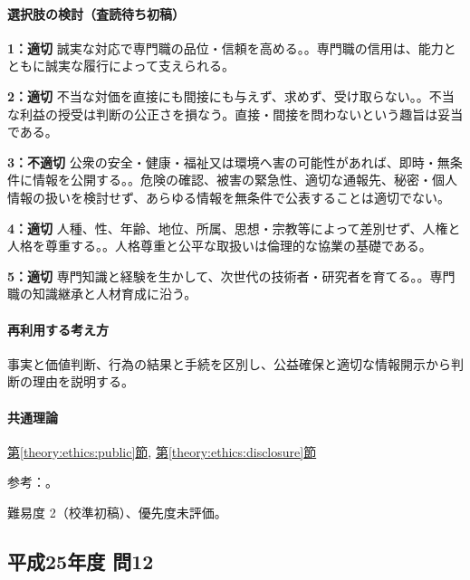 \paragraph{選択肢の検討（査読待ち初稿）}\mbox{}\par

\noindent\textbf{1：適切} 誠実な対応で専門職の品位・信頼を高める。。専門職の信用は、能力とともに誠実な履行によって支えられる。\par

\noindent\textbf{2：適切} 不当な対価を直接にも間接にも与えず、求めず、受け取らない。。不当な利益の授受は判断の公正さを損なう。直接・間接を問わないという趣旨は妥当である。\par

\noindent\textbf{3：不適切} 公衆の安全・健康・福祉又は環境へ害の可能性があれば、即時・無条件に情報を公開する。。危険の確認、被害の緊急性、適切な通報先、秘密・個人情報の扱いを検討せず、あらゆる情報を無条件で公表することは適切でない。\par

\noindent\textbf{4：適切} 人種、性、年齢、地位、所属、思想・宗教等によって差別せず、人権と人格を尊重する。。人格尊重と公平な取扱いは倫理的な協業の基礎である。\par

\noindent\textbf{5：適切} 専門知識と経験を生かして、次世代の技術者・研究者を育てる。。専門職の知識継承と人材育成に沿う。\par

\paragraph{再利用する考え方} 事実と価値判断、行為の結果と手続を区別し、公益確保と適切な情報開示から判断の理由を説明する。

\paragraph{共通理論} \hyperref[theory:ethics:public]{第\ref*{theory:ethics:public}節}, \hyperref[theory:ethics:disclosure]{第\ref*{theory:ethics:disclosure}節}

\par 参考：\cite{ipej_ethics2011,ipej_ethics2023}。

\par 難易度 2（校準初稿）、優先度未評価。

\subsection{平成25年度 問12}
\label{q:h25-reg-apt-12}

